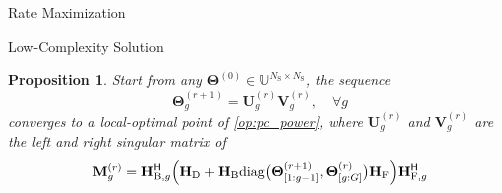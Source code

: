\documentclass[journal]{IEEEtran}
\newtheorem{proposition}{Proposition}
\begin{document}
\begin{section}{Rate Maximization}
\begin{subsection}{Low-Complexity Solution}
		\begin{proposition}
			Start from any $\mathbf{\Theta}^{(0)} \in \mathbb{U}^{N_\mathrm{S} \times N_\mathrm{S}}$, the sequence
			\begin{equation}
				\mathbf{\Theta}_g^{(r+1)} = \mathbf{U}_g^{(r)} \mathbf{V}_g^{(r)}, \quad \forall g
			\end{equation}
			converges to a local-optimal point of \eqref{op:pc_power}, where $\mathbf{U}_g^{(r)}$ and $\mathbf{V}_g^{(r)}$ are the left and right singular matrix of
			\begin{equation}
				\mathbf{M}_g^{(r)} = \mathbf{H}_{\mathrm{B},g}^\mathsf{H} \Bigl(\mathbf{H}_\mathrm{D} + \mathbf{H}_\mathrm{B} \mathrm{diag}\bigl(\mathbf{\Theta}_{[1:g-1]}^{(r+1)},\mathbf{\Theta}_{[g:G]}^{(r)}\bigr) \mathbf{H}_\mathrm{F}\Bigr) \mathbf{H}_{\mathrm{F},g}^\mathsf{H}
			\end{equation}
		\end{proposition}


\end{subsection}
\end{section}
\end{document}
